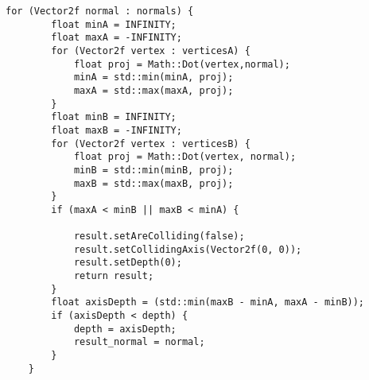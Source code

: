 \begin{verbatim}
for (Vector2f normal : normals) {
        float minA = INFINITY;
        float maxA = -INFINITY;
        for (Vector2f vertex : verticesA) {
            float proj = Math::Dot(vertex,normal);
            minA = std::min(minA, proj);
            maxA = std::max(maxA, proj);
        }
        float minB = INFINITY;
        float maxB = -INFINITY;
        for (Vector2f vertex : verticesB) {
            float proj = Math::Dot(vertex, normal);
            minB = std::min(minB, proj);
            maxB = std::max(maxB, proj);
        }
        if (maxA < minB || maxB < minA) {

            result.setAreColliding(false);
            result.setCollidingAxis(Vector2f(0, 0));
            result.setDepth(0);
            return result;
        }
        float axisDepth = (std::min(maxB - minA, maxA - minB));
        if (axisDepth < depth) {
            depth = axisDepth;
            result_normal = normal;
        }
    }
\end{verbatim}